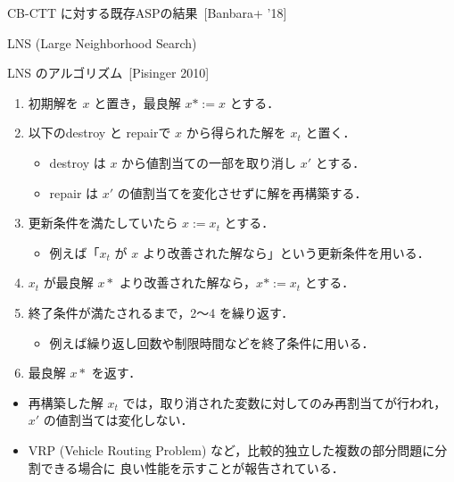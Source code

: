 \documentclass[11pt,dvipdfmx,handout]{beamer}
\begin{document}
\begin{frame}{CB-CTT に対する既存ASPの結果~[Banbara+ '18]}
  \centering
  \scriptsize
  \begin{tableC}
    
  \end{tableC}
\end{frame}
\begin{frame}{LNS (Large Neighborhood Search)}
  \begin{block}{LNS のアルゴリズム~[Pisinger 2010]}
    \begin{enumerate}
      \compress
      \item 初期解を $x$ と置き，最良解 $x* := x$ とする．
      \item 以下のdestroy と repairで $x$ から得られた解を $x_t$ と置く．
      \begin{itemize}
        \compress
      \item destroy は $x$ から値割当ての一部を取り消し $x'$ とする．
      \item repair は $x'$ の\alert{値割当てを変化させずに解を再構築}する．
      \end{itemize}
      \item 更新条件を満たしていたら $x := x_t$ とする．
      \begin{itemize}
        \item 例えば「$x_t$ が $x$ より改善された解なら」という更新条件を用いる．
      \end{itemize}
      \item $x_t$ が最良解 $x*$ より改善された解なら，$x* := x_t$ とする．
      \item 終了条件が満たされるまで，2〜4 を繰り返す．
      \begin{itemize}
        \item 例えば繰り返し回数や制限時間などを終了条件に用いる．
      \end{itemize}
      \item 最良解 $x*$ を返す．
    \end{enumerate}
  \end{block}
  \begin{itemize}
    \item 再構築した解 $x_t$ では，取り消された変数に対してのみ再割当てが行われ，$x'$ の値割当ては変化しない．
    \item VRP (Vehicle Routing Problem) など，比較的独立した複数の部分問題に分割できる場合に
          良い性能を示すことが報告されている．
  \end{itemize}
\end{frame}
\end{document}
